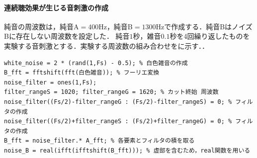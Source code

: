 \paragraph{連続聴効果が生じる音刺激の作成}純音の周波数は，純音A\(=400\textrm{Hz}\)，純音B\(=1300\textrm{Hz}\)で作成する．純音BはノイズBに存在しない周波数を設定した．
純音\(1\)秒，雑音\(0.1\)秒を4回繰り返したものを実験する音刺激とする．実験する周波数の組み合わせをに示す．\scall{}．
\begin{lstlisting}[caption={白色雑音の作成},label={src:白色雑音の作成}]
white_noise = 2 * (rand(1,Fs) - 0.5); % 白色雑音の作成
B_fft = fftshift(fft(白色雑音)); % フーリエ変換
noise_filter = ones(1,Fs);
filter_rangeS = 1020; filter_rangeG = 1620; % カット終始 周波数
noise_filter((Fs/2)-filter_rangeG : (Fs/2)-filter_rangeS) = 0; % フィルタの作成
noise_filter((Fs/2)+filter_rangeS : (Fs/2)+filter_rangeG) = 0; % フィルタの作成
B_fft = noise_filter.* A_fft; % 各要素とフィルタの積を取る
noise_B = real(ifft(ifftshift(B_fft))); % 虚部を含むため，real関数を用いる
\end{lstlisting}
